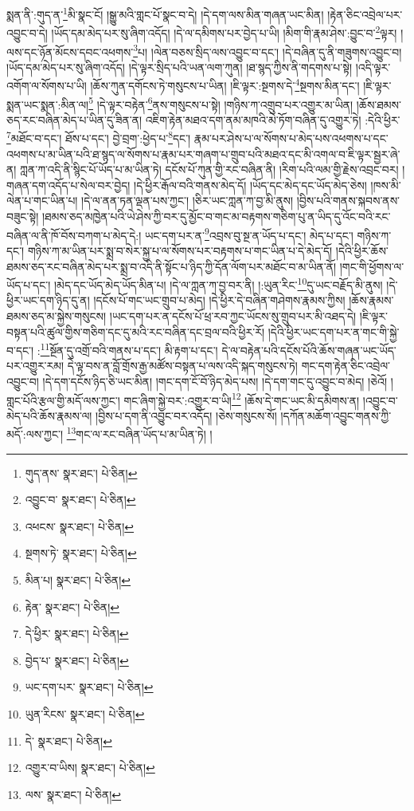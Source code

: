 སྨན་ནི་:གུད་ན་\footnote{གུད་ནས་  སྣར་ཐང་།  པེ་ཅིན། }མི་སྣང་ངོ། །སྒྱུ་མའི་གླང་པོ་སྣང་བ་དེ། །དེ་དག་ལས་མིན་གཞན་ཡང་མིན། །རྟེན་ཅིང་འབྲེལ་པར་འབྱུང་བ་དེ། །ཡོད་དམ་མེད་པར་སུ་ཞིག་འདོད། །དེ་ལ་དམིགས་པར་བྱེད་པ་ཡི། །མིག་གི་རྣམ་ཤེས་:བྱུང་བ་\footnote{འབྱུང་བ་  སྣར་ཐང་།  པེ་ཅིན། }ལྟར། །ལས་དང་ཉོན་མོངས་དབང་འཕགས་\footnote{འཕངས་  སྣར་ཐང་།  པེ་ཅིན། }པ། །ལེན་བཅས་སྲིད་ལས་འབྱུང་བ་དང་། །དེ་བཞིན་དུ་ནི་གཟུགས་འབྱུང་བ། །ཡོད་དམ་མེད་པར་སུ་ཞིག་འདོད། །དེ་ལྟར་སྲིད་པའི་ཡན་ལག་ཀུན། །ཐ་སྙད་ཀྱིས་ནི་གདགས་པ་སྟེ། །འདི་ལྟར་འགོག་ལ་སོགས་པ་ཡི། །ཆོས་ཀུན་དགོངས་ཏེ་གསུངས་པ་ཡིན། །ཇི་ལྟར་:སྔགས་དེ་\footnote{སྔགས་ཏེ་  སྣར་ཐང་།  པེ་ཅིན། }སྔགས་མིན་དང་། །ཇི་ལྟར་སྨན་ཡང་སྨན་:མིན་ལ།\footnote{མིན་པ།  སྣར་ཐང་།  པེ་ཅིན། } །དེ་ལྟར་བརྟེན་\footnote{རྟེན་  སྣར་ཐང་།  པེ་ཅིན། }ནས་གསུངས་པ་སྟེ། །གཉིས་ཀ་འགྲུབ་པར་འགྱུར་མ་ཡིན། །ཆོས་ཐམས་ཅད་རང་བཞིན་མེད་པ་ཡིན་དུ་ཟིན་ན། འཇིག་རྟེན་མཐའ་དག་ནམ་མཁའི་མེ་ཏོག་བཞིན་དུ་འགྱུར་ཏེ། :དེའི་ཕྱིར་\footnote{དེ་ཕྱིར་  སྣར་ཐང་།  པེ་ཅིན། }མཐོང་བ་དང་། ཐོས་པ་དང་། བྱེ་བྲག་:ཕྱེད་པ་\footnote{བྱེད་པ་  སྣར་ཐང་།  པེ་ཅིན། }དང་། རྣམ་པར་ཤེས་པ་ལ་སོགས་པ་མེད་པས་འཕགས་པ་དང་འཕགས་པ་མ་ཡིན་པའི་ཐ་སྙད་ལ་སོགས་པ་རྣམ་པར་གཞག་པ་གྲུབ་པའི་མཐའ་དང་མི་འགལ་བ་ཇི་ལྟར་སྦྱར་ཞེ་ན། ཀླན་ཀ་འདི་ནི་སྙིང་པོ་ཡོད་པ་མ་ཡིན་ཏེ། དངོས་པོ་ཀུན་གྱི་རང་བཞིན་ནི། །རིག་པའི་ལམ་གྱི་རྗེས་འབྲང་བར། །གཞན་དག་འདོད་པ་སེལ་བར་བྱེད། །དེ་ཕྱིར་རྒོལ་བའི་གནས་མེད་དོ། །ཡོད་དང་མེད་དང་ཡོད་མེད་ཅེས། །ཁས་མི་ལེན་པ་གང་ཡིན་པ། །དེ་ལ་ནན་ཏན་ལྡན་པས་ཀྱང་། །ཅིར་ཡང་ཀླན་ཀ་བྱ་མི་ནུས། །བྱིས་པའི་གནས་སྐབས་ནས་བཟུང་སྟེ། །ཐམས་ཅད་མཁྱེན་པའི་ཡེ་ཤེས་ཀྱི་བར་དུ་མྱོང་བ་གང་མ་བརྟགས་གཅིག་པུ་ན་ཡིད་དུ་འོང་བའི་རང་བཞིན་ལ་ནི་ཁོ་བོས་བཀག་པ་མེད་དེ:། ཡང་དག་པར་ན་\footnote{ཡང་དག་པར་  སྣར་ཐང་།  པེ་ཅིན། }འབྲས་བུ་སྔ་ན་ཡོད་པ་དང་། མེད་པ་དང་། གཉིས་ཀ་དང་། གཉིས་ཀ་མ་ཡིན་པར་སྨྲ་བ་སེར་སྐྱ་པ་ལ་སོགས་པར་བརྟགས་པ་གང་ཡིན་པ་དེ་མེད་དོ། །དེའི་ཕྱིར་ཆོས་ཐམས་ཅད་རང་བཞིན་མེད་པར་སྨྲ་བ་འདི་ནི་སྟོང་པ་ཉིད་ཀྱི་དོན་ལོག་པར་མཐོང་བ་མ་ཡིན་ནོ། །གང་གི་ཕྱོགས་ལ་ཡོད་པ་དང་། །མེད་དང་ཡོད་མེད་ཡོད་མིན་པ། །དེ་ལ་ཀླན་ཀ་བྱ་བར་ནི། །:ཡུན་རིང་\footnote{ཡུན་རིངས་  སྣར་ཐང་།  པེ་ཅིན། }དུ་ཡང་བརྗོད་མི་ནུས། །དེ་ཕྱིར་ཡང་དག་ཉིད་དུ་ན། །དངོས་པོ་གང་ཡང་གྲུབ་པ་མེད། །དེ་ཕྱིར་དེ་བཞིན་གཤེགས་རྣམས་ཀྱིས། །ཆོས་རྣམས་ཐམས་ཅད་མ་སྐྱེས་གསུངས། །ཡང་དག་པར་ན་དངོས་པོ་ཕྲ་རབ་ཀྱང་ཡོངས་སུ་གྲུབ་པར་མི་འཐད་དེ། །ཇི་ལྟར་བསྟན་པའི་ཚུལ་གྱིས་གཅིག་དང་དུ་མའི་རང་བཞིན་དང་བྲལ་བའི་ཕྱིར་རོ། །དེའི་ཕྱིར་ཡང་དག་པར་ན་གང་གི་སྐྱེ་བ་དང་། :\footnote{དེ་  སྣར་ཐང་།  པེ་ཅིན། }སྔོན་དུ་འགྲོ་བའི་གནས་པ་དང་། མི་རྟག་པ་དང་། དེ་ལ་བརྟེན་པའི་དངོས་པོའི་ཆོས་གཞན་ཡང་ཡོད་པར་འགྱུར་རམ། དེ་ལྟ་བས་ན་བློ་གྲོས་རྒྱ་མཚོས་བསྟན་པ་ལས་འདི་སྐད་གསུངས་ཏེ། གང་དག་རྟེན་ཅིང་འབྲེལ་འབྱུང་བ། །དེ་དག་དངོས་ཉིད་ཅི་ཡང་མིན། །གང་དག་ངོ་བོ་ཉིད་མེད་པས། །དེ་དག་གང་དུ་འབྱུང་བ་མེད། །ཅེའོ། །གླང་པོའི་རྩལ་གྱི་མདོ་ལས་ཀྱང་། གང་ཞིག་སྐྱེ་བར་:འགྱུར་བ་ཡི།\footnote{འགྱུར་བ་ཡིས།  སྣར་ཐང་།  པེ་ཅིན། } །ཆོས་དེ་གང་ཡང་མི་དམིགས་ན། །འབྱུང་བ་མེད་པའི་ཆོས་རྣམས་ལ། །བྱིས་པ་དག་ནི་འབྱུང་བར་འདོད། །ཅེས་གསུངས་སོ། །དཀོན་མཆོག་འབྱུང་གནས་ཀྱི་མདོ་:ལས་ཀྱང་། \footnote{ལས་  སྣར་ཐང་།  པེ་ཅིན། }གང་ལ་རང་བཞིན་ཡོད་པ་མ་ཡིན་ཏེ། །
